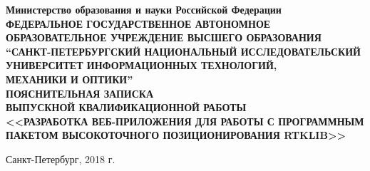 
\thispagestyle{empty}

\begin{center}
  {\bfseries
    {
      \subnormal
      Министерство образования и науки Российской Федерации
    } \\[-0.5em]
    {
      \scriptsize
      ФЕДЕРАЛЬНОЕ ГОСУДАРСТВЕННОЕ АВТОНОМНОЕ ОБРАЗОВАТЕЛЬНОЕ УЧРЕЖДЕНИЕ ВЫСШЕГО ОБРАЗОВАНИЯ
    } \\[-0.25em]
    {
      \subnormal
      “САНКТ-ПЕТЕРБУРГСКИЙ НАЦИОНАЛЬНЫЙ ИССЛЕДОВАТЕЛЬСКИЙ \\[-0.5em]
      УНИВЕРСИТЕТ ИНФОРМАЦИОННЫХ ТЕХНОЛОГИЙ, \\[-0.75em]
      МЕХАНИКИ И ОПТИКИ”
    } \\[0.25em]
    {
      \normalsize
      ПОЯСНИТЕЛЬНАЯ ЗАПИСКА \\[-0.5em]
      ВЫПУСКНОЙ КВАЛИФИКАЦИОННОЙ РАБОТЫ
    } \\[5.75em]
    {
      \normalsize
      <<РАЗРАБОТКА ВЕБ-ПРИЛОЖЕНИЯ ДЛЯ РАБОТЫ С ПРОГРАММНЫМ ПАКЕТОМ ВЫСОКОТОЧНОГО ПОЗИЦИОНИРОВАНИЯ RTKLIB>>
    } \\[5.5em]
  }
\end{center}

\vfill

\begin{center}
  {
    \normalsize
    Санкт-Петербург, 2018 г.
  }
\end{center}

\restoregeometry